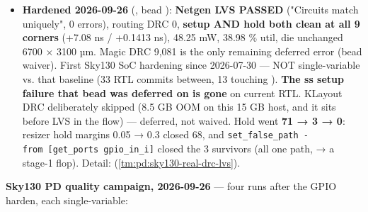 \begin{record}
\begin{itemize}
  clear-no-effect-on-level,  partial-word clear,
   masking the output only,  held 50
  cycles,  reads-as-0, out-of-range access).
   \textbf{217/217} across 27 suites, up from 201.
  Extending the APB window broke
  , which probed
   expecting DECERR --- now the GPIO slot;
   bumped to , the maintenance step
  that test\textquotesingle s own comment prescribes for each window
  growth.
\item
  \textbf{Hardened 2026-09-26} (, bead
  ): \textbf{Netgen LVS PASSED} ("Circuits match uniquely", 0
  errors), routing DRC 0, \textbf{setup AND hold both clean at all 9
  corners} (+7.08 ns / +0.1413 ns), 48.25 mW, 38.98 \% util, die
  unchanged 6700 × 3100 µm. Magic DRC 9,081 is the only remaining
  deferred error (bead  waiver). First Sky130 SoC hardening
  since 2026-07-30 --- \warn{} NOT single-variable vs. that baseline (33
  RTL commits between, 13 touching ). \textbf{The ss
  setup failure that bead  was deferred on is gone} on current
  RTL. KLayout DRC deliberately skipped (8.5 GB OOM on this 15 GB host,
  and it sits before LVS in the flow) --- deferred, not waived. Hold
  went \textbf{71 → 3 → 0}: resizer hold margins 0.05 → 0.3 closed 68,
  and
  \texttt{set\_\allowbreak{}false\_\allowbreak{}path\ -\allowbreak{}from\ [get\_\allowbreak{}ports\ gpio\_\allowbreak{}in\_\allowbreak{}i]}
  closed the 3 survivors (all one path,  → a
   stage-1 flop). Detail:
   (\cref{tm:pd:sky130-real-drc-lvs}).
\end{itemize}

\textbf{Sky130 PD quality campaign, 2026-09-26} --- four runs after the
GPIO harden, each single-variable:

{\small\setlength{\tabcolsep}{4pt}

}
\end{record}
